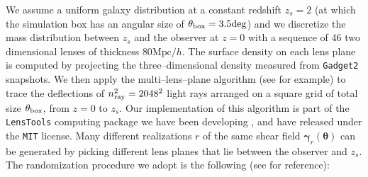 \documentclass[reprint,aps,prd,superscriptaddress,showkeys,showpacs]{revtex4-1}
\begin{document}
We assume a uniform galaxy distribution at a constant redshift $z_s=2$
(at which the simulation box has an angular size of $\theta_{\rm
  box}=3.5\mathrm{deg}$) and we discretize the mass distribution
between $z_s$ and the observer at $z=0$ with a sequence of 46 two
dimensional lenses of thickness $80\mathrm{Mpc}/h$. The surface
density on each lens plane is computed by projecting the
three--dimensional density measured from \texttt{Gadget2}
snapshots. We then apply the multi--lens--plane algorithm (see
\citep{RayTracingHartlap,RayTracingJain} for example) to trace the
deflections of $n_{\rm ray}^2=2048^2$ light rays arranged on a square grid
of total size $\theta_{\rm box}$, from $z=0$ to $z_s$. Our
implementation of this algorithm is part of the \texttt{LensTools}
computing package we have been developing \citep{LensTools}, and have
released under the \texttt{MIT} license. Many different realizations
$r$ of the same shear field $\pmb{\gamma}_r(\pmb{\theta})$ can be
generated by picking different lens planes that lie between the
observer and $z_s$. The randomization procedure we adopt is the
following (see \citep{Sato12} for reference):
\end{document}
